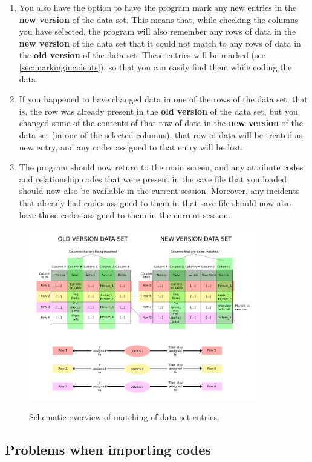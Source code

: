 \documentclass{memoir}
\begin{document}
\begin{enumerate}
\item{You also have the option to have the program mark any new entries in the \textbf{new version} of the data set. This means that, while checking the columns you have selected, the program will also remember any rows of data in the \textbf{new version} of the data set that it could not match to any rows of data in the \textbf{old version} of the data set. These entries will be marked (see \ref{sec:markingincidents}), so that you can easily find them while coding the data.}
\item{If you happened to have changed data in one of the rows of the data set, that is, the row was already present in the \textbf{old version} of the data set, but you changed some of the contents of that row of data in the \textbf{new version} of the data set (in one of the selected columns), that row of data will be treated as new entry, and any codes assigned to that entry will be lost.}
\item{The program should now return to the main screen, and any attribute codes and relationship codes that were present in the save file that you loaded should now also be available in the current session. Moreover, any incidents that already had codes assigned to them in that save file should now also have those codes assigned to them in the current session.}
\end{enumerate}

\begin{figure}[h!]
  \centering
  \caption{Schematic overview of matching of data set entries.}
  \includegraphics[width=100mm]{Diagram_1.pdf}
  \label{fig:importingcodesdiagram}
\end{figure}

\subsection{Problems when importing codes}
\label{sec:problemsimportingcodes}
\end{document}
